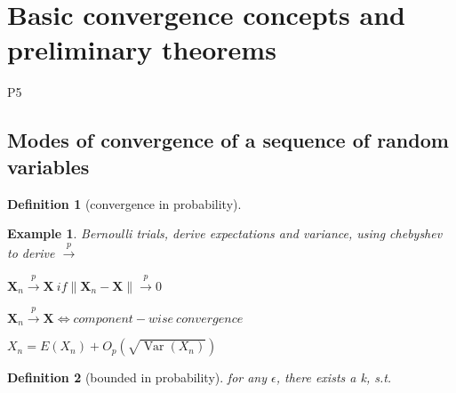 \documentclass{ctexart}
\newtheorem{definition}{Definition}[subsection]
\newtheorem{example}{Example}[subsection]
\begin{document}





\section{Basic convergence concepts and preliminary theorems}
P5
\subsection{Modes of convergence of a sequence of random variables}

\begin{definition}[convergence in probability]
  
\end{definition}

\begin{example}
  Bernoulli trials, derive expectations and variance, using chebyshev to derive \(\xrightarrow{p}\) 
\end{example}

\(\boldsymbol{X}_n \xrightarrow{p}\boldsymbol{X}\ if \|\boldsymbol{X}_n-\boldsymbol{X}\|\xrightarrow{p}0\) 

\(\boldsymbol{X}_n \xrightarrow{p}\boldsymbol{X} \iff component-wise\ convergence\)

\(X_n=E(X_n)+O_p(\sqrt{\operatorname{Var}(X_n)})\) 
\begin{definition}[bounded in probability]
  for any \(\epsilon\), there exists a k, s.t.\sqrt{\[
  P(|X_{n}|>k)\le \epsilon
  \] } 
\end{definition}
\end{document}
